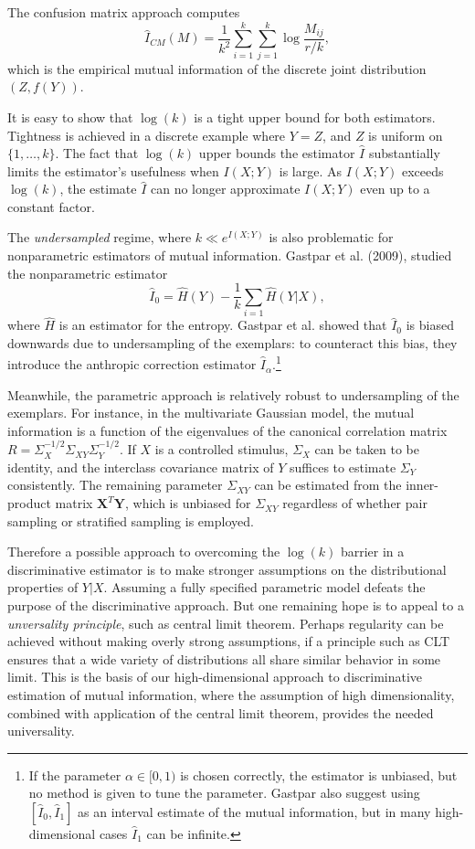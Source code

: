 \documentclass{article}
\begin{document}
The confusion matrix approach computes
\[
\hat{I}_{CM}(M) = \frac{1}{k^2} \sum_{i=1}^k \sum_{j=1}^k \log \frac{M_{ij}}{r/k},
\]
which is the empirical mutual information of the discrete joint distribution $(Z, f(Y))$.

It is easy to show that $\log(k)$ is a tight upper bound for both estimators.
Tightness is achieved in a discrete example where $Y = Z$, and $Z$ is uniform on $\{1,\hdots, k\}$.
The fact that $\log(k)$ upper bounds the estimator $\hat{I}$ substantially limits the estimator's usefulness when $I(X; Y)$ is large.  As $I(X; Y)$ exceeds $\log(k)$, the estimate $\hat{I}$ can no longer approximate $I(X; Y)$ even up to a constant factor.

The \emph{undersampled} regime, where $k \ll e^{I(X; Y)}$ is also problematic for nonparametric estimators of mutual information.
Gastpar et al. (2009), studied the nonparametric estimator
\[
\hat{I}_0 = \hat{H}(Y) - \frac{1}{k}\sum_{i=1}\hat{H}(Y|X),
\]
where $\hat{H}$ is an estimator for the entropy.
Gastpar et al. showed that $\hat{I}_0$ is biased downwards due to undersampling of the exemplars:
to counteract this bias, they introduce the anthropic correction estimator $\hat{I}_\alpha$.\footnote{
If the parameter $\alpha \in [0, 1)$ is chosen correctly, the estimator is unbiased, but no method is given to tune the parameter.  Gastpar also suggest using $[\hat{I}_0, \hat{I}_1]$ as an interval estimate of the mutual information, but in many high-dimensional cases $\hat{I}_1$ can be infinite.
}

Meanwhile, the parametric approach is relatively robust to undersampling of the exemplars.
For instance, in the multivariate Gaussian model, the mutual information is a function of the eigenvalues of the canonical correlation matrix $R  =\Sigma_X^{-1/2}\Sigma_{XY}\Sigma_Y^{-1/2}$.  If $X$ is a controlled stimulus, $\Sigma_X$ can be taken to be identity, and the interclass covariance matrix of $Y$ suffices to estimate $\Sigma_Y$ consistently.  The remaining parameter $\Sigma_{XY}$ can be estimated from the inner-product matrix $\boldsymbol{X}^T \boldsymbol{Y}$, which is unbiased for $\Sigma_{XY}$ regardless of whether pair sampling or stratified sampling is employed.

Therefore a possible approach to overcoming the $\log(k)$ barrier in a discriminative estimator
is to make stronger assumptions on the distributional properties of $Y|X$.  Assuming a fully specified
parametric model defeats the purpose of the discriminative approach.  But one remaining hope is
to appeal to a \emph{unversality principle}, such as central limit theorem. Perhaps regularity can be achieved
without making overly strong assumptions, if a principle such as CLT ensures that a wide variety of
distributions all share similar behavior in some limit.  This is the basis of our high-dimensional
approach to discriminative estimation of mutual information, where the assumption of high dimensionality,
combined with application of the central limit theorem, provides the needed universality.
\end{document}
